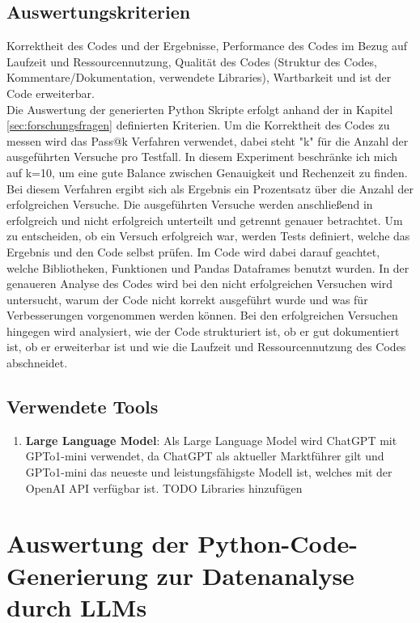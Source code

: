 \documentclass[11pt,a4paper]{article}
\begin{document}
\subsection{Auswertungskriterien}
\label{sec:auswertungskriterien}
    Korrektheit des Codes und der Ergebnisse, Performance des Codes im Bezug auf Laufzeit und Ressourcennutzung, Qualität des Codes (Struktur des Codes, Kommentare/Dokumentation, verwendete Libraries), Wartbarkeit und ist der Code erweiterbar.\\

    Die Auswertung der generierten Python Skripte erfolgt anhand der in Kapitel \ref{sec:forschungsfragen} definierten Kriterien. Um die Korrektheit des Codes zu messen wird das Pass@k Verfahren verwendet, dabei steht "k" für die Anzahl der ausgeführten Versuche pro Testfall. In diesem Experiment beschränke ich mich auf k=10, um eine gute Balance zwischen Genauigkeit und Rechenzeit zu finden. Bei diesem Verfahren ergibt sich als Ergebnis ein Prozentsatz über die Anzahl der erfolgreichen Versuche. Die ausgeführten Versuche werden anschließend in erfolgreich und nicht erfolgreich unterteilt und getrennt genauer betrachtet. Um zu entscheiden, ob ein Versuch erfolgreich war, werden Tests definiert, welche das Ergebnis und den Code selbst prüfen. Im Code wird dabei darauf geachtet, welche Bibliotheken, Funktionen und Pandas Dataframes benutzt wurden.
    In der genaueren Analyse des Codes wird bei den nicht erfolgreichen Versuchen wird untersucht, warum der Code nicht korrekt ausgeführt wurde und was für Verbesserungen vorgenommen werden können. Bei den erfolgreichen Versuchen hingegen wird analysiert, wie der Code strukturiert ist, ob er gut dokumentiert ist, ob er erweiterbar ist und wie die Laufzeit und Ressourcennutzung des Codes abschneidet.

\subsection{Verwendete Tools}
    \begin{enumerate}
        \item \textbf{Large Language Model}: Als Large Language Model wird ChatGPT mit GPTo1-mini verwendet, da ChatGPT als aktueller Marktführer gilt und GPTo1-mini das neueste und leistungsfähigste Modell ist, welches mit der OpenAI API verfügbar ist.
        TODO Libraries hinzufügen
    \end{enumerate}

\section{Auswertung der Python-Code-Generierung zur Datenanalyse durch LLMs}
\label{sec:auswertung }
\end{document}

